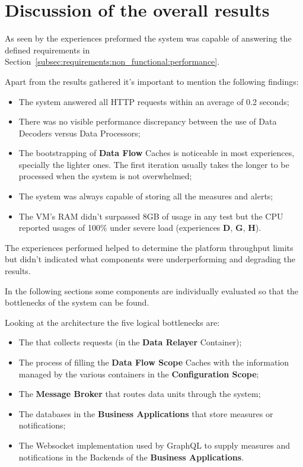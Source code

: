 \section{Discussion of the overall results}
\label{subsubsec:evaluation:overview}

As seen by the experiences preformed the system was capable of answering the defined requirements in Section~\ref{subsec:requirements:non_functional:performance}.

Apart from the results gathered it's important to mention the following findings:

\begin{itemize}
    \item The system answered all HTTP requests within an average of 0.2 seconds;
    \item There was no visible performance discrepancy between the use of Data Decoders versus Data Processors;
    \item The bootstrapping of \textbf{Data Flow} Caches is noticeable in most experiences, specially the lighter ones. The first iteration usually takes the longer to be processed when the system is not overwhelmed;
    \item The system was always capable of storing all the measures and alerts;
    \item The \gls{VM}'s RAM didn't surpassed 8GB of usage in any test but the CPU reported usages of 100\% under severe load (experiences \textbf{D}, \textbf{G}, \textbf{H}).
\end{itemize}

The experiences performed helped to determine the platform throughput limits but didn't indicated what components were underperforming and degrading the results.

In the following sections some components are individually evaluated so that the bottlenecks of the system can be found.

Looking at the architecture the five logical bottlenecks are:

\begin{itemize}
    \item The  that collects requests (in the \textbf{Data Relayer} Container);
    \item The process of filling the \textbf{Data Flow Scope} Caches with the information managed by the various containers in the \textbf{Configuration Scope};
    \item The \textbf{Message Broker} that routes data units through the system;
    \item The databases in the \textbf{Business Applications} that store measures or notifications;
    \item The Websocket implementation used by GraphQL to supply measures and notifications in the Backends of the \textbf{Business Applications}.
\end{itemize}

